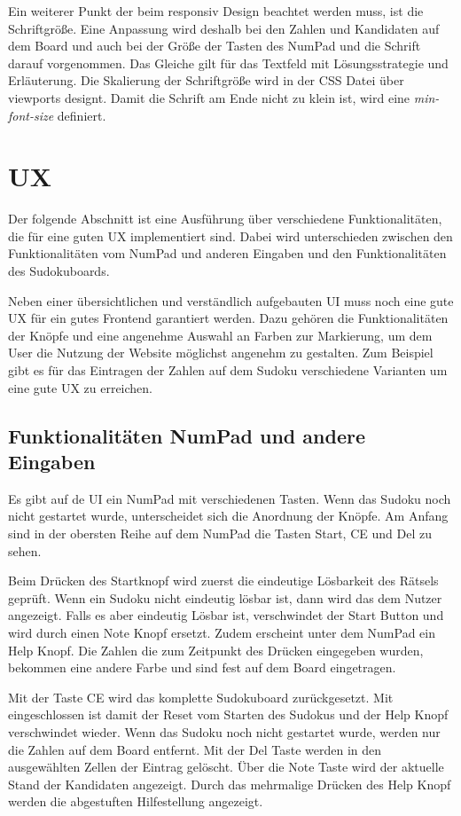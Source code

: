 Ein weiterer Punkt der beim responsiv Design beachtet werden muss, ist die Schriftgröße. Eine Anpassung wird deshalb bei den Zahlen und Kandidaten auf dem Board und auch bei der Größe der Tasten des NumPad und die Schrift darauf vorgenommen. Das Gleiche gilt für das Textfeld mit Lösungsstrategie und Erläuterung. Die Skalierung der Schriftgröße wird in der \ac{CSS} Datei über viewports designt. Damit die Schrift am Ende nicht zu klein ist, wird eine \textit{min-font-size} definiert. 


\section{\acl{UX}}
Der folgende Abschnitt ist eine Ausführung über verschiedene Funktionalitäten, die für eine guten \acl{UX} implementiert sind. Dabei wird unterschieden zwischen den Funktionalitäten vom NumPad und anderen Eingaben und den Funktionalitäten des Sudokuboards.

Neben einer übersichtlichen und verständlich aufgebauten \ac{UI} muss noch eine gute \ac{UX} für ein gutes Frontend garantiert werden. Dazu gehören die Funktionalitäten der Knöpfe und eine angenehme Auswahl an Farben zur Markierung, um dem User die Nutzung der Website möglichst angenehm zu gestalten. Zum Beispiel gibt es für das Eintragen der Zahlen auf dem Sudoku verschiedene Varianten um eine gute \ac{UX} zu erreichen. 

\subsection{Funktionalitäten NumPad und andere Eingaben}
Es gibt auf de \ac{UI} ein NumPad mit verschiedenen Tasten. Wenn das Sudoku noch nicht gestartet wurde, unterscheidet sich die Anordnung der Knöpfe. Am Anfang sind in der obersten Reihe auf dem NumPad die Tasten Start, \ac{CE} und Del zu sehen. 

Beim Drücken des Startknopf wird zuerst die eindeutige Lösbarkeit des Rätsels geprüft. Wenn ein Sudoku nicht eindeutig lösbar ist, dann wird das dem Nutzer angezeigt. Falls es aber eindeutig Lösbar ist, verschwindet der Start Button und wird durch einen Note Knopf ersetzt. Zudem erscheint unter dem NumPad ein Help Knopf. Die Zahlen die zum Zeitpunkt des Drücken eingegeben wurden, bekommen eine andere Farbe und sind fest auf dem Board eingetragen. 

Mit der Taste \ac{CE} wird das komplette Sudokuboard zurückgesetzt. Mit eingeschlossen ist damit der Reset vom Starten des Sudokus und der Help Knopf verschwindet wieder. Wenn das Sudoku noch nicht gestartet wurde, werden nur die Zahlen auf dem Board entfernt. Mit der Del Taste werden in den ausgewählten Zellen der Eintrag gelöscht. Über die Note Taste wird der aktuelle Stand der Kandidaten angezeigt. Durch das mehrmalige Drücken des Help Knopf werden die abgestuften Hilfestellung angezeigt.


